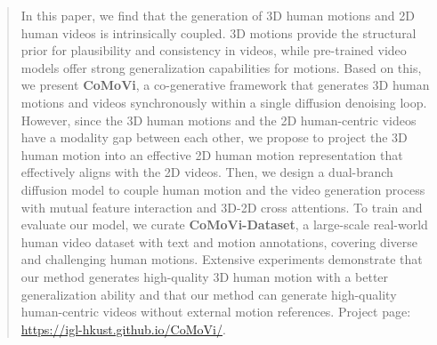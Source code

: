 \begin{abstract}
In this paper, we find that the generation of 3D human motions and 2D human videos is intrinsically coupled. 3D motions provide the structural prior for plausibility and consistency in videos, while pre-trained video models offer strong generalization capabilities for motions. Based on this, we present \textbf{CoMoVi}, a co-generative framework that generates 3D human motions and videos synchronously within a single diffusion denoising loop. However, since the 3D human motions and the 2D human-centric videos have a modality gap between each other, we propose to project the 3D human motion into an effective 2D human motion representation that effectively aligns with the 2D videos. Then, we design a dual-branch diffusion model to couple human motion and the video generation process with mutual feature interaction and 3D-2D cross attentions. To train and evaluate our model, we curate \textbf{CoMoVi-Dataset}, a large-scale real-world human video dataset with text and motion annotations, covering diverse and challenging human motions. Extensive experiments demonstrate that our method generates high-quality 3D human motion with a better generalization ability and that our method can generate high-quality human-centric videos without external motion references. Project page: \href{https://igl-hkust.github.io/CoMoVi/}{https://igl-hkust.github.io/CoMoVi/}.


\end{abstract}